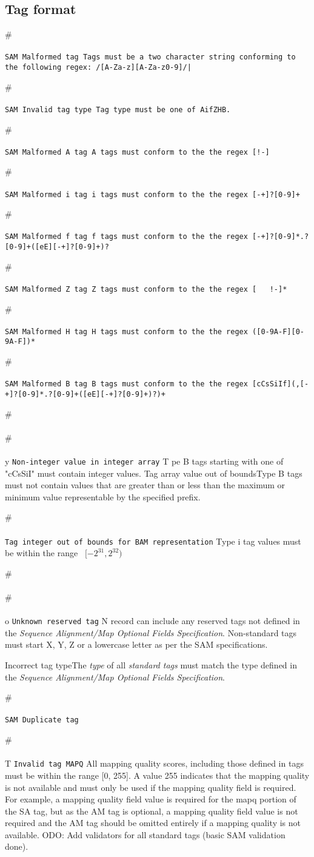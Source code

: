 \documentclass[10pt]{article}
\newcommand{\samrule}{\tt SAM}
\newcommand{\samstrictrule}[3]{
#
	\paragraph{} #3
	{\tt #1}
	#2
}
\begin{document}
\subsection{Tag format}
\samstrictrule{Malformed tag}{Tags must be a two character string conforming to the following regex: {\tt /[A-Za-z][A-Za-z0-9]/}|}{\samrule}
\samstrictrule{Invalid tag type}{Tag type must be one of AifZHB.}{\samrule}
\samstrictrule{Malformed A tag}{A tags must conform to the the regex {\tt [!-\char126]}}{\samrule}
\samstrictrule{Malformed i tag}{i tags must conform to the the regex {\tt [-+]?[0-9]+}}{\samrule}
\samstrictrule{Malformed f tag}{f tags must conform to the the regex {\tt [-+]?[0-9]*\char92.?[0-9]+([eE][-+]?[0-9]+)?}}{\samrule}
\samstrictrule{Malformed Z tag}{Z tags must conform to the the regex {\tt [\,\,\,!-\char126]*}}{\samrule}
\samstrictrule{Malformed H tag}{H tags must conform to the the regex {\tt ([0-9A-F][0-9A-F])*}}{\samrule}
\samstrictrule{Malformed B tag}{B tags must conform to the the regex {\tt [cCsSiIf](,[-+]?[0-9]*\char92.?[0-9]+([eE][-+]?[0-9]+)?)+}}{\samrule}
\samstrictrule{Non-integer value in integer array}{Type B tags starting with one of "cCsSiI" must contain integer values.}
\samstrictrule{Tag array value out of bounds}{Type B tags must not contain values that are greater than or less than the maximum or minimum value representable by the specified prefix.}
\samstrictrule{Tag integer out of bounds for BAM representation}{Type i tag values must be within the range ~$[-2^{31},2^{32})$}{\bam}
\samstrictrule{Unknown reserved tag}{
	No record can include any reserved tags not defined in the
	{\sl Sequence Alignment/Map Optional Fields Specification}.
	Non-standard tags must start X, Y, Z or a lowercase letter as per the SAM specifications.
}
\samstrictrule{Incorrect tag type}{The \textit{type} of all \textit{standard tags} must match the type
defined in the {\sl Sequence Alignment/Map Optional Fields Specification}.}
\samstrictrule{Duplicate tag}{}{\samrule}
\samstrictrule{Invalid tag MAPQ}{All mapping quality scores, including those defined in tags must be within the range [0, 255].
A value 255 indicates that the mapping quality is not available and must only be used if the
mapping quality field is required. For example, a mapping quality field value is required for the mapq portion of the SA tag, but as the AM tag is optional, a mapping quality
field value is not required and the AM tag should be omitted entirely if a mapping quality is
not available.}


TODO: Add validators for all standard tags (basic SAM validation done).
\end{document}
